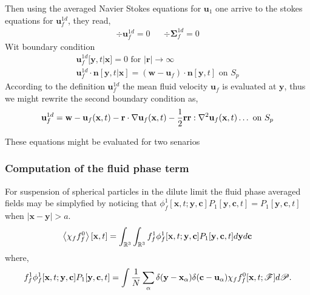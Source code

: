 Then using the averaged Navier Stokes equations for $\textbf{u}_1$ one arrive to the stokes equations for $\textbf{u}_f^{1d}$, they read, 
\begin{align*}
    \div \textbf{u}_f^{1d} = 0 &&
    \div \bm\Sigma_f^{1d} = 0 
\end{align*}
Wit boundary condition 
\begin{align*}
    \textbf{u}_f^{1d}[\textbf{y},t|\textbf{x}] = 0 \text{  for  } |\textbf{r}| \to \infty\\
    \textbf{u}_f^{1d}\cdot \textbf{n}[\textbf{y},t|\textbf{x}] = (\textbf{w} - \textbf{u}_f)\cdot \textbf{n}[\textbf{y},t]\text{  on  } S_p
\end{align*}
According to the definition $\textbf{u}_f^{1d}$ the mean fluid velocity $\textbf{u}_f$ is evaluated at $\textbf{y}$, thus we might rewrite the second boundary condition as, 
\begin{align*}
    \textbf{u}_f^{1d} = \textbf{w} - \textbf{u}_f(\textbf{x},t)
    -\textbf{r}\cdot\mathbf{\nabla}\textbf{u}_f(\textbf{x},t)
    -\frac{1}{2}\textbf{rr}:\mathbf{\nabla}^2\textbf{u}_f(\textbf{x},t)
    \ldots
    \text{  on  } S_p
\end{align*}

These equations might be evaluated for two senarios

\subsubsection*{Computation of the fluid phase term}

For suspension of spherical particles in the dilute limit the fluid phase averaged fields may be simplyfied by noticing that $\phi_f^1[\textbf{x},t;\textbf{y},\textbf{c}] P_1[\textbf{y},\textbf{c},t] = P_1[\textbf{y},\textbf{c},t]$ when $|\textbf{x} - \textbf{y}| > a$. 
\begin{equation}
    \left<\chi_f f_f^0\right>[\textbf{x},t]
    = 
    \int_{\mathbb{R}^3}
    \int_{\mathbb{R}^3}
    f_f^1 \phi_f^1[\textbf{x},t;\textbf{y},\textbf{c}] P_1[\textbf{y},\textbf{c},t]
    d\textbf{y} 
    d\textbf{c}
\end{equation}
where,
\begin{equation*}
    f_f^1 \phi_f^1[\textbf{x},t;\textbf{y},\textbf{c}] P_1[\textbf{y},\textbf{c},t]
    =     
    \int
    \frac{1}{N}
    \sum_\alpha \delta(\textbf{y}-\textbf{x}_\alpha)
     \delta(\textbf{c}-\textbf{u}_\alpha)
    \chi_f
    f^0_f[\textbf{x},t;\mathscr{F}]
    d\mathscr{P}.
\end{equation*}

